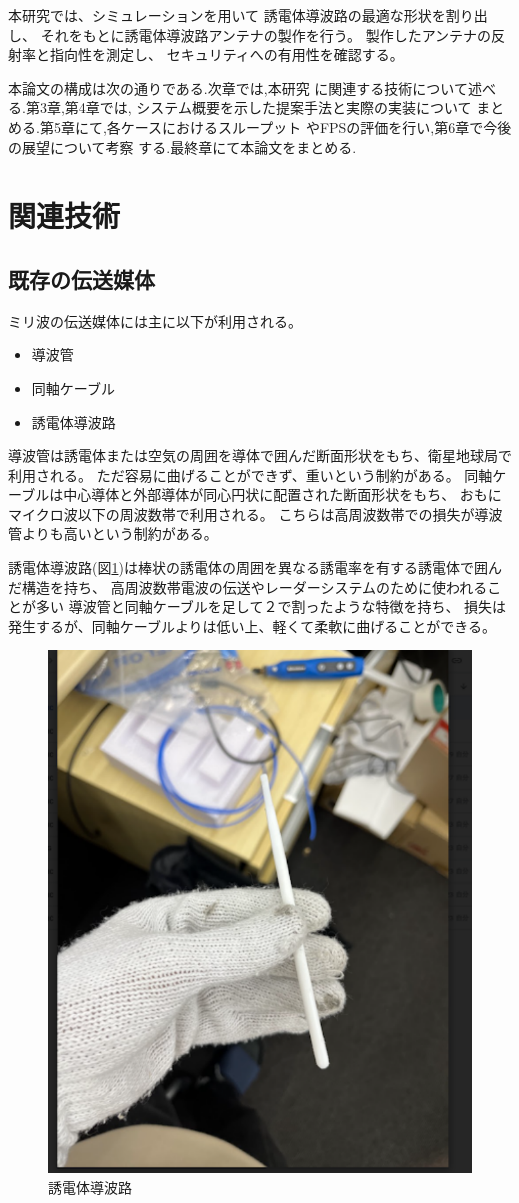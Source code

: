 \documentclass[technicalreport]{ieicej}
\begin{document}
本研究では、シミュレーションを用いて
誘電体導波路の最適な形状を割り出し、
それをもとに誘電体導波路アンテナの製作を行う。
製作したアンテナの反射率と指向性を測定し、
セキュリティへの有用性を確認する。

本論文の構成は次の通りである.次章では,本研究
に関連する技術について述べる.第3章,第4章では,
システム概要を示した提案手法と実際の実装について
まとめる.第5章にて,各ケースにおけるスループット
やFPSの評価を行い,第6章で今後の展望について考察
する.最終章にて本論文をまとめる.

\section{関連技術}

\subsection{既存の伝送媒体}

ミリ波の伝送媒体には主に以下が利用される。
\begin{itemize}
  \item 導波管
  \item 同軸ケーブル
  \item 誘電体導波路
\end{itemize}

導波管は誘電体または空気の周囲を導体で囲んだ断面形状をもち、衛星地球局で利用される。
ただ容易に曲げることができず、重いという制約がある。
同軸ケーブルは中心導体と外部導体が同心円状に配置された断面形状をもち、
おもにマイクロ波以下の周波数帯で利用される。
こちらは高周波数帯での損失が導波管よりも高いという制約がある。

誘電体導波路(図\ref{fig:dielectric_waveguide})は棒状の誘電体の周囲を異なる誘電率を有する誘電体で囲んだ構造を持ち、
高周波数帯電波の伝送やレーダーシステム\cite{4297420}のために使われることが多い
導波管と同軸ケーブルを足して２で割ったような特徴を持ち、
損失は発生するが、同軸ケーブルよりは低い上、軽くて柔軟に曲げることができる。


\begin{figure}[tb]
  \begin{center}
    \includegraphics[bb=0 0 311 384, width=0.5\linewidth]{img/waveguide.pdf}
    \caption{誘電体導波路}
    \label{fig:dielectric_waveguide}
  \end{center}
\end{figure}
\end{document}
